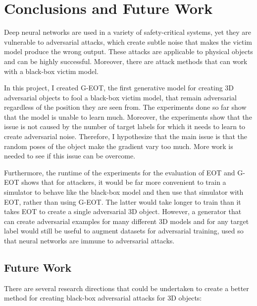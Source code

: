 \chapter{Conclusions and Future Work}
\label{chap:conclusion}

Deep neural networks are used in a variety of safety-critical systems, yet they are vulnerable to adversarial attacks, which create subtle noise that makes the victim model produce the wrong output. These attacks are applicable to physical objects and can be highly successful. Moreover, there are attack methods that can work with a black-box victim model.

In this project, I created G-EOT, the first generative model for creating 3D adversarial objects to fool a black-box victim model, that remain adversarial regardless of the position they are seen from. The experiments done so far show that the model is unable to learn much. Moreover, the experiments show that the issue is not caused by the number of target labels for which it needs to learn to create adversarial noise. Therefore, I hypothesize that the main issue is that the random poses of the object make the gradient vary too much. More work is needed to see if this issue can be overcome.

Furthermore, the runtime of the experiments for the evaluation of EOT \cite{athalye} and G-EOT shows that for attackers, it would be far more convenient to train a simulator to behave like the black-box model and then use that simulator with EOT, rather than using G-EOT. The latter would take longer to train than it takes EOT to create a single adversarial 3D object. However, a generator that can create adversarial examples for many different 3D models and for any target label would still be useful to augment datasets for adversarial training, used so that neural networks are immune to adversarial attacks.

\section{Future Work}
\label{sec:conclusion_future_work}

There are several research directions that could be undertaken to create a better method for creating black-box adversarial attacks for 3D objects:

